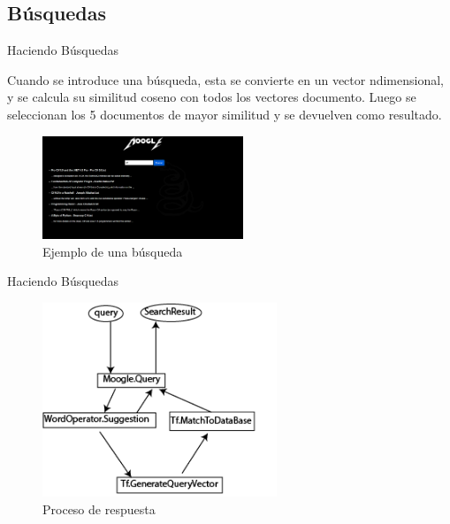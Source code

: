 \subsection{Búsquedas}
\begin{frame}{Haciendo Búsquedas}

Cuando se introduce una búsqueda, esta se convierte en un vector ndimensional,
y se calcula su similitud coseno con todos los vectores documento.
Luego se seleccionan los 5 documentos de mayor similitud y se devuelven
como resultado.
\pause

\begin{figure}[h]
    \center
    \includegraphics[width=6cm]{busqueda.png}
    \caption{Ejemplo de una búsqueda}
\end{figure}

\end{frame}

\begin{frame}[fragile]{Haciendo Búsquedas}

\begin{figure}[h]
    \center
    \includegraphics[width=7cm]{DiagramaDeClases.png}
    \caption{Proceso de respuesta}
\end{figure}

\end{frame}
